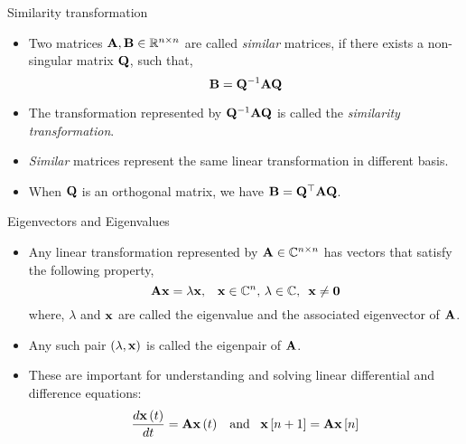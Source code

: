 \documentclass[aspectratio=169]{beamer}
\let\olditem\item
\renewcommand{\item}{\setlength{\itemsep}{\fill}\olditem}
\def\mf{\ensuremath\mathbf}
\def\mb{\ensuremath\mathbb}
\def\bmx{\ensuremath\begin{bmatrix*}[r]}
\def\emx{\ensuremath\end{bmatrix*}}
\begin{document}


\begin{frame}[t]{Similarity transformation}
\begin{itemize}
    \item Two matrices $\mf{A}, \mf{B} \in \mb{R}^{n \times n}$ are called \textit{similar} matrices, if there exists a non-singular matrix $\mf{Q}$, such that,
    \[ \mf{B} = \mf{Q}^{-1}\mf{A}\mf{Q} \]

    \item The transformation represented by $\mf{Q}^{-1}\mf{A}\mf{Q}$ is called the \textit{similarity transformation}.

    \item \textit{Similar} matrices represent the same linear transformation in different basis.

    \item When $\mf{Q}$ is an orthogonal matrix, we have $\mf{B} = \mf{Q}^\top\mf{A}\mf{Q}$. 
\end{itemize}
\end{frame}


\begin{frame}[t]{Eigenvectors and Eigenvalues}
\begin{itemize}
    \item Any linear transformation represented by $\mf{A} \in \mb{C}^{n \times n}$ has vectors that satisfy the following property,
    \[ \mf{Ax} = \lambda \mf{x}, \,\,\,\,\, \mf{x} \in \mb{C}^n, \, \lambda \in \mb{C}, \,\,\, \mf{x} \neq \mf{0} \]
    where, $\lambda$ and $\mf{x}$ are called the eigenvalue and the associated eigenvector of $\mf{A}$.
    
    \item Any such pair $\left(\lambda, \mf{x}\right)$ is called the eigenpair of $\mf{A}$.
    
    \item These are important for understanding and solving linear differential and difference equations:
    \[ \frac{d\mf{x}\left(t\right)}{dt} = \mf{A}\mf{x}\left(t\right) \,\,\, \text{ and } \,\,\, \mf{x}\left[n+1\right] = \mf{A}\mf{x}\left[n\right] \]
\end{itemize}
\end{frame}
\end{document}
